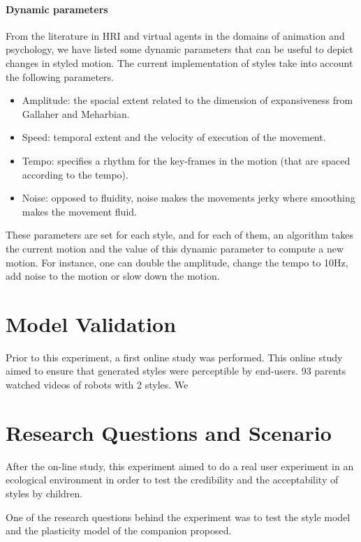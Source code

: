 \documentclass[a4paper,twocolumn]{svjour3}
\begin{document}
\paragraph{Dynamic parameters}
From the literature in HRI and virtual agents in the domains of animation and psychology, we have listed some dynamic parameters that can be useful to depict changes in styled motion.
The current implementation of styles take into account the following parameters. 
\begin{itemize}[noitemsep,nolistsep]
	\item Amplitude: the spacial extent related to the dimension of expansiveness from Gallaher and Meharbian.
	\item Speed: temporal extent and the velocity of execution of the movement.
	\item Tempo: specifies a rhythm for the key-frames in the motion (that are spaced according to the tempo).
	\item Noise: opposed to fluidity, noise makes the movements jerky where smoothing makes the movement fluid.
\end{itemize}
These parameters are set for each style, and for each of them, an algorithm takes the current motion and the value of this dynamic parameter to compute a new motion.
For instance, one can double the amplitude, change the tempo to 10Hz, add noise to the motion or slow down the motion.

\section{Model Validation}
Prior to this experiment, a first online study was performed. 
This online study aimed to ensure that generated styles were perceptible by end-users. 
93 parents watched videos of robots with 2 styles. 
We 


\section{Research Questions and Scenario}\label{sec:research-questions-and-scenario}
After the on-line study, this experiment aimed to do a real user experiment in an ecological environment in order to test the credibility and the acceptability of styles by children. 

One of the research questions behind the experiment was to test the style model and the plasticity model of the companion proposed. 
\end{document}
